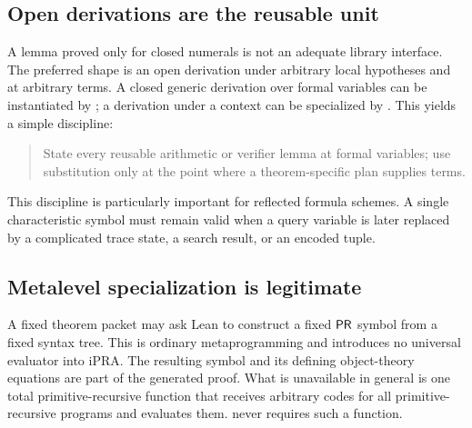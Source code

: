 \subsection{Open derivations are the reusable unit}

A lemma proved only for closed numerals is not an adequate library interface.
The preferred shape is an open derivation under arbitrary local hypotheses and
at arbitrary terms.  A closed generic derivation over formal variables can be
instantiated by ; a derivation under a context can be
specialized by .  This yields a simple discipline:

\begin{quote}
State every reusable arithmetic or verifier lemma at formal variables; use
substitution only at the point where a theorem-specific plan supplies terms.
\end{quote}

This discipline is particularly important for reflected formula schemes.  A
single characteristic symbol must remain valid when a query variable is later
replaced by a complicated trace state, a search result, or an encoded tuple.

\subsection{Metalevel specialization is legitimate}

A fixed theorem packet may ask Lean to construct a fixed \(\mathsf{PR}\) symbol from a
fixed syntax tree.  This is ordinary metaprogramming and introduces no
universal evaluator into iPRA.  The resulting symbol and its defining
object-theory equations are part of the generated proof.  What is unavailable
in general is one total primitive-recursive function that receives arbitrary
codes for all primitive-recursive programs and evaluates them.  \Scope never
requires such a function.
